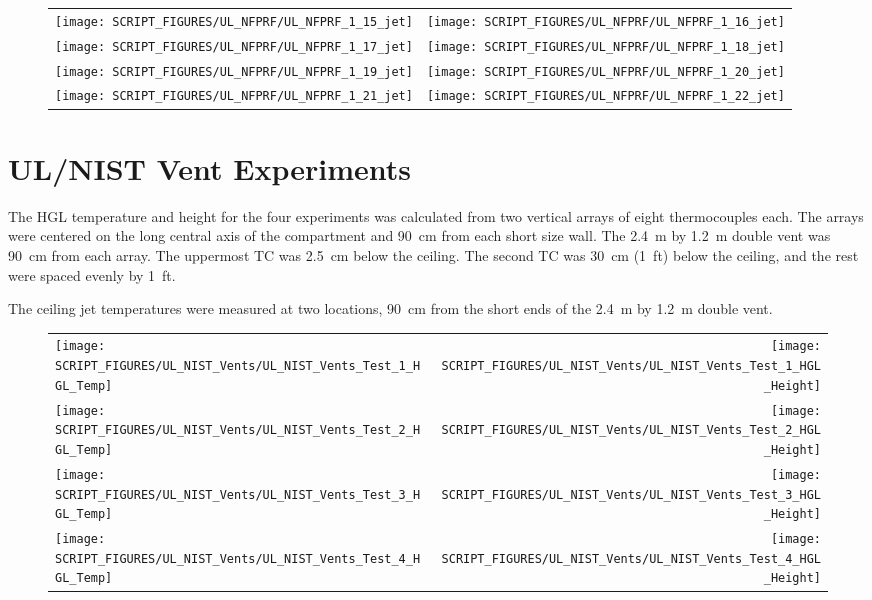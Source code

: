 \begin{figure}[p]
\begin{tabular*}{\textwidth}{l@{\extracolsep{\fill}}r}
\texttt{[image: SCRIPT\_FIGURES/UL\_NFPRF/UL\_NFPRF\_1\_15\_jet]} &
\texttt{[image: SCRIPT\_FIGURES/UL\_NFPRF/UL\_NFPRF\_1\_16\_jet]} \\
\texttt{[image: SCRIPT\_FIGURES/UL\_NFPRF/UL\_NFPRF\_1\_17\_jet]} &
\texttt{[image: SCRIPT\_FIGURES/UL\_NFPRF/UL\_NFPRF\_1\_18\_jet]} \\
\texttt{[image: SCRIPT\_FIGURES/UL\_NFPRF/UL\_NFPRF\_1\_19\_jet]} &
\texttt{[image: SCRIPT\_FIGURES/UL\_NFPRF/UL\_NFPRF\_1\_20\_jet]} \\
\texttt{[image: SCRIPT\_FIGURES/UL\_NFPRF/UL\_NFPRF\_1\_21\_jet]} &
\texttt{[image: SCRIPT\_FIGURES/UL\_NFPRF/UL\_NFPRF\_1\_22\_jet]}
\end{tabular*}
\label{UL_NFPRF_jet_3}
\end{figure}

\clearpage

\section{UL/NIST Vent Experiments}

The HGL temperature and height for the four experiments was calculated from two vertical arrays of eight thermocouples each. The arrays were centered on the long central axis of the compartment and 90~cm from each short size wall. The 2.4~m by 1.2~m double vent was 90~cm from each array. The uppermost TC was 2.5~cm below the ceiling. The second TC was 30~cm (1~ft) below the ceiling, and the rest were spaced evenly by 1~ft.

The ceiling jet temperatures were measured at two locations, 90~cm from the short ends of the 2.4~m by 1.2~m double vent.

\begin{figure}[p]
\begin{tabular*}{\textwidth}{l@{\extracolsep{\fill}}r}
\texttt{[image: SCRIPT\_FIGURES/UL\_NIST\_Vents/UL\_NIST\_Vents\_Test\_1\_HGL\_Temp]} &
\texttt{[image: SCRIPT\_FIGURES/UL\_NIST\_Vents/UL\_NIST\_Vents\_Test\_1\_HGL\_Height]} \\
\texttt{[image: SCRIPT\_FIGURES/UL\_NIST\_Vents/UL\_NIST\_Vents\_Test\_2\_HGL\_Temp]} &
\texttt{[image: SCRIPT\_FIGURES/UL\_NIST\_Vents/UL\_NIST\_Vents\_Test\_2\_HGL\_Height]} \\
\texttt{[image: SCRIPT\_FIGURES/UL\_NIST\_Vents/UL\_NIST\_Vents\_Test\_3\_HGL\_Temp]} &
\texttt{[image: SCRIPT\_FIGURES/UL\_NIST\_Vents/UL\_NIST\_Vents\_Test\_3\_HGL\_Height]} \\
\texttt{[image: SCRIPT\_FIGURES/UL\_NIST\_Vents/UL\_NIST\_Vents\_Test\_4\_HGL\_Temp]} &
\texttt{[image: SCRIPT\_FIGURES/UL\_NIST\_Vents/UL\_NIST\_Vents\_Test\_4\_HGL\_Height]}
\end{tabular*}
\end{figure}

